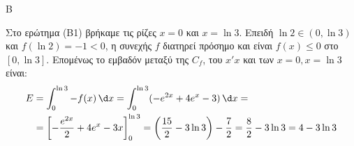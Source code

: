 \begin{thema}{Β}
\begin{erwthma}
\item Στο ερώτημα (Β1) βρήκαμε τις ρίζες $x=0$ και $x=\ln 3$. Επειδή $\ln 2 \in (0, \ln 3)$ και $f(\ln 2)=-1 < 0$, η συνεχής $f$ διατηρεί πρόσημο και είναι $f(x) \le 0$ στο $[0, \ln 3]$.
Επομένως το εμβαδόν μεταξύ της $C_f$, του $x'x$ και των $x=0, x=\ln 3$ είναι:
\begin{align*}
E &= \int_0^{\ln 3} -f(x)\,\d x = \int_0^{\ln 3} (-e^{2x} + 4e^x - 3)\,\d x =\\
&= \left[ -\frac{e^{2x}}{2} + 4e^x - 3x \right]_0^{\ln 3}= \left( \frac{15}{2} - 3\ln 3 \right) - \frac{7}{2} = \frac{8}{2} - 3\ln 3 = 4 - 3\ln 3
\end{align*}

\end{erwthma}
\end{thema}

